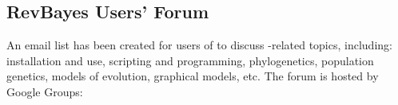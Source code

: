 \bigskip
\subsection{RevBayes Users' Forum}

An email list has been created for users of \RevBayes to discuss \RevBayes-related topics, including: \RevBayes installation and use, scripting and programming, phylogenetics, population genetics, models of evolution, graphical models, etc. The forum is hosted by Google Groups:






